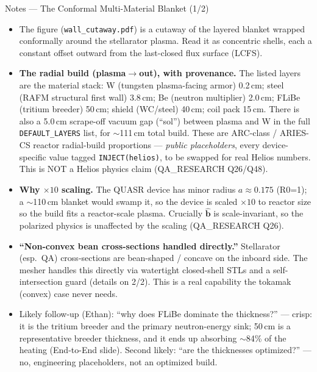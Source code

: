 \documentclass[11pt,aspectratio=169]{beamer}
\newcommand{\bhat}{\hat{\mathbf{b}}}
\begin{document}
\begin{frame}[allowframebreaks]{Notes --- The Conformal Multi-Material Blanket (1/2)}
{\color{red}\footnotesize
\begin{itemize}
\item The figure (\texttt{wall\_cutaway.pdf}) is a cutaway of the layered blanket wrapped
      conformally around the stellarator plasma. Read it as concentric shells, each a constant
      offset outward from the last-closed flux surface (LCFS).
\item \textbf{The radial build (plasma$\to$out), with provenance.} The listed layers are the
      material stack: W (tungsten plasma-facing armor) 0.2\,cm; steel (RAFM structural first wall)
      3.8\,cm; Be (neutron multiplier) 2.0\,cm; FLiBe (tritium breeder) 50\,cm; shield (WC/steel)
      40\,cm; coil pack 15\,cm. There is also a 5.0\,cm scrape-off vacuum gap (``sol'') between
      plasma and W in the full \texttt{DEFAULT\_LAYERS} list, for $\sim$111\,cm total build. These
      are ARC-class / ARIES-CS reactor radial-build proportions --- \emph{public placeholders},
      every device-specific value tagged \texttt{INJECT(helios)}, to be swapped for real Helios
      numbers. This is NOT a Helios physics claim (QA\_RESEARCH Q26/Q48).
\item \textbf{Why $\times10$ scaling.} The QUASR device has minor radius $a\approx0.175$ (R0=1); a
      $\sim$110\,cm blanket would swamp it, so the device is scaled $\times10$ to reactor size so the
      build fits a reactor-scale plasma. Crucially $\bhat$ is scale-invariant, so the polarized
      physics is unaffected by the scaling (QA\_RESEARCH Q26).
\item \textbf{``Non-convex bean cross-sections handled directly.''} Stellarator (esp.\ QA)
      cross-sections are bean-shaped / concave on the inboard side. The mesher handles this directly
      via watertight closed-shell STLs and a self-intersection guard (details on 2/2). This is a real
      capability the tokamak (convex) case never needs.
\item Likely follow-up (Ethan): ``why does FLiBe dominate the thickness?'' --- crisp: it is the
      tritium breeder and the primary neutron-energy sink; 50\,cm is a representative breeder
      thickness, and it ends up absorbing $\sim$84\% of the heating (End-to-End slide). Second likely:
      ``are the thicknesses optimized?'' --- no, engineering placeholders, not an optimized build.
\end{itemize}
}
\end{frame}
\end{document}
